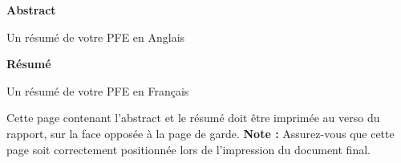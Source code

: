 \newpage
\begin{center}
\textbf{Abstract}
\end{center}

Un résumé de votre PFE en Anglais

\begin{center}
\textbf{Résumé}
\end{center}

Un résumé de votre PFE en Français

\thispagestyle{empty}
\strut
\begin{tcolorbox}[
   title=Important,
   colback=blue!5,
   colframe=blue!75,
   coltitle=white,
   fonttitle=\bfseries
]
Cette page contenant l'abstract et le résumé doit être imprimée au verso du rapport, sur la face opposée à la page de garde.
\medskip
\textbf{Note :} Assurez-vous que cette page soit correctement positionnée lors de l'impression du document final.
\end{tcolorbox}